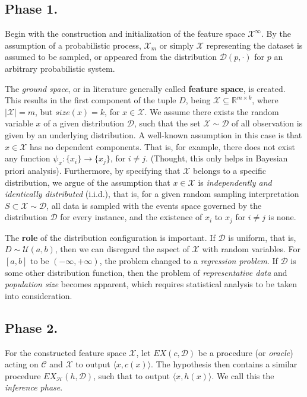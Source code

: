 \documentclass[10pt,oneside,oldfontcommands,dvipsnames,article]{memoir}
\begin{document}
\subsection*{Phase 1.}
Begin with the construction and initialization of the feature space $\mathcal{X}^{\infty}$. By the assumption of a probabilistic process, $\mathcal{X}_{m}$ or simply $\mathcal{X}$ representing the dataset is assumed to be sampled, or appeared from the distribution $\mathcal{D}(p,\cdot)$ for $p$ an arbitrary probabilistic system. 

The \textit{ground space}, or in literature generally called \textbf{feature space}, is created. This results in the first component of the tuple $D$, being $\mathcal{X}\subseteq \mathbb{R}^{m\times k}$, where $\lvert \mathcal{X} \rvert=m$, but $size(x)=k$, for $x\in\mathcal{X}$. We assume there exists the random variable $x$ of a given distribution $\mathcal{D}$, such that the set $\mathcal{X}\sim \mathcal{D}$ of all observation is given by an underlying distribution. A well-known assumption in this case is that $x\in\mathcal{X}$ has no dependent components. That is, for example, there does not exist any function $\psi_{x}: \{ x_{i} \}\to \{ x_{j} \}$, for $i\neq j$. (Thought, this only helps in Bayesian priori analysis). Furthermore, by specifying that $\mathcal{X}$ belongs to a specific distribution, we argue of the assumption that $x\in\mathcal{X}$ is \textit{independently and identically distributed} (i.i.d.), that is, for a given random sampling interpretation $S\subset\mathcal{X}\sim \mathcal{D}$, all data is sampled with the events space governed by the distribution $\mathcal{D}$ for every instance, and the existence of $x_{i}$ to $x_{j}$ for $i\neq j$ is none. 

The \textbf{role} of the distribution configuration is important. If $\mathcal{D}$ is uniform, that is, $D\sim \mathcal{U}(a,b)$, then we can disregard the aspect of $\mathcal{X}$ with random variables. For $[a,b]$ to be $(-\infty,+\infty)$, the problem changed to a \textit{regression problem}. If $\mathcal{D}$ is some other distribution function, then the problem of \textit{representative data} and \textit{population size} becomes apparent, which requires statistical analysis to be taken into consideration. 
\subsection*{Phase 2.}
For the constructed feature space $\mathcal{X}$, let $EX(c,\mathcal{D})$ be a procedure (or \textit{oracle}) acting on $\mathcal{C}$ and $\mathcal{X}$ to output $\langle x,c(x)\rangle$. The hypothesis then contains a similar procedure $EX_{\mathcal{H}}(h,\mathcal{D})$, such that to output $\langle x,h(x)\rangle$. We call this the \textit{inference phase}. 
    
\end{document}
